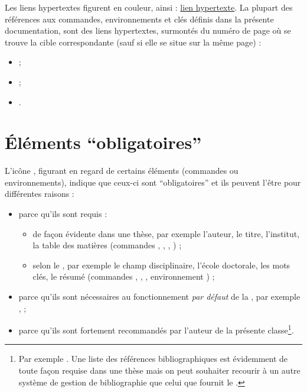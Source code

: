 Les liens hypertextes figurent en couleur, ainsi :
\href{https://gte.univ-littoral.fr/members/dbitouze/pub/latex}{lien hypertexte}.
La plupart des références aux commandes, environnements et clés définis dans la
présente documentation, sont des liens hypertextes, surmontés du numéro de page
où se trouve la cible correspondante (sauf si elle se situe sur la même page) :
\begin{itemize}
\item {} ;
\item {} ;
\item {}.
\end{itemize}

\section{Éléments \enquote{obligatoires}}
\label{sec-comm-oblig}
%

L'icône \mandatory{}, figurant en regard de certains éléments (commandes ou
environnements), indique que ceux-ci sont \enquote{obligatoires} et ils peuvent
l'être pour différentes raisons :
\begin{itemize}
\item parce qu'ils sont requis :
  \begin{itemize}
  \item de façon évidente dans une thèse, par exemple l'auteur, le titre,
    l'institut, la table des matières (commandes ,
    , , ) ;
  \item selon le \textcite{guidoct}, par exemple le champ disciplinaire,
    l'école doctorale, les mots clés, le résumé (commandes
    , , ,
    environnement ) ;
  \end{itemize}
\item parce qu'ils sont nécessaires au fonctionnement \emph{par défaut} de la
  \yatCl{}, par exemple ,  ;
\item parce qu'ils sont fortement recommandés par l'auteur de la présente
  classe\footnote{Par exemple \protect{}. Une liste des
    références bibliographiques est évidemment de toute façon requise dans une
    thèse mais on peut souhaiter recourir à un autre système de gestion de
    bibliographie que celui que fournit le .}.
\end{itemize}

